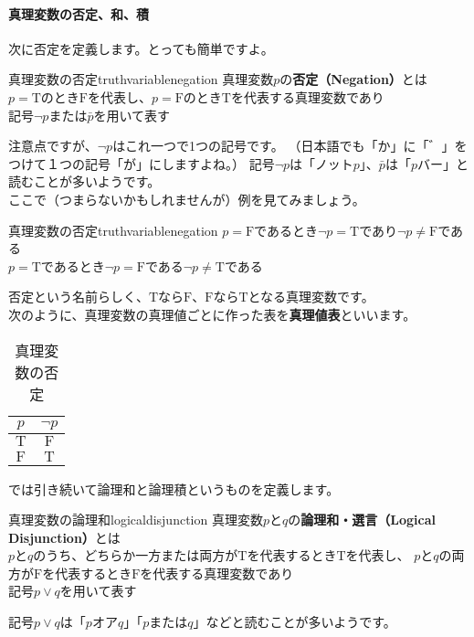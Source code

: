 \documentclass[report]{jlreq}%
\newcounter{myso}
\begin{document}
\paragraph*{真理変数の否定、和、積}
次に否定を定義します。とっても簡単ですよ。

\begin{mysodef}{真理変数の否定}{truthvariablenegation}
	真理変数$p$の\textbf{否定（Negation）}とは\\
	$p=\mathrm{T}$のとき$\mathrm{F}$を代表し、$p=\mathrm{F}$のとき$\mathrm{T}$を代表する真理変数であり\\
	記号$\neg{}p$または$\bar{p}$を用いて表す
\end{mysodef}
注意点ですが、$\neg{}p$はこれ一つで1つの記号です。
（日本語でも「か」に「゛」をつけて１つの記号「が」にしますよね。）
記号$\neg{}p$は「ノット$p$」、$\bar{p}$は「$p$バー」と読むことが多いようです。\\
ここで（つまらないかもしれませんが）例を見てみましょう。
\begin{mysoeg}{真理変数の否定}{truthvariablenegation}
	$p=\mathrm{F}$であるとき$\neg{}p=\mathrm{T}$であり$\neg{}p\ne{}\mathrm{F}$である\\
	$p=\mathrm{T}$であるとき$\neg{}p=\mathrm{F}$である$\neg{}p\ne{}\mathrm{T}$である
\end{mysoeg}
否定という名前らしく、$\mathrm{T}$なら$\mathrm{F}$、$\mathrm{F}$なら$\mathrm{T}$となる真理変数です。\\
\pagebreak
次のように、真理変数の真理値ごとに作った表を\textbf{真理値表}といいます。
\begin{table}[htbp]
	\caption{真理変数の否定}
	\label{tb:truthvariablenegation}
	\centering
	\begin{tabular}{|c|c|}
		\hline
		$p$ & $\neg{}p$ \\
		\hline\hline
		$\mathrm{T}$ & $\mathrm{F}$ \\
		\hline
		$\mathrm{F}$ & $\mathrm{T}$ \\
		\hline
	\end{tabular}
\end{table}

では引き続いて論理和と論理積というものを定義します。

\begin{mysodef}{真理変数の論理和}{logicaldisjunction}
	真理変数$p$と$q$の\textbf{論理和・選言（Logical Disjunction）}とは\\
	$p$と$q$のうち、どちらか一方または両方が$\mathrm{T}$を代表するとき$\mathrm{T}$を代表し、
	$p$と$q$の両方が$\mathrm{F}$を代表するとき$\mathrm{F}$を代表する真理変数であり\\
	記号$p\lor{}q$を用いて表す
\end{mysodef}
記号$p\lor{}q$は「$p$オア$q$」「$p$または$q$」などと読むことが多いようです。\\
\end{document}

